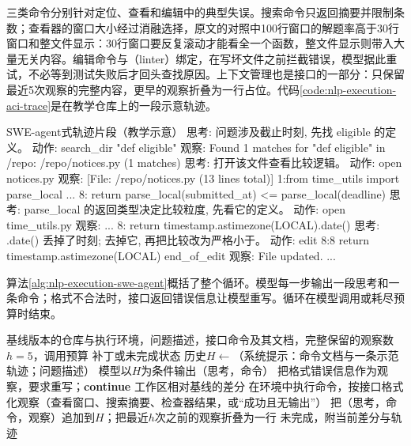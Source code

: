 三类命令分别针对定位、查看和编辑中的典型失误。搜索命令只返回摘要并限制条数；查看器的窗口大小经过消融选择，原文的对照中100行窗口的解题率高于30行窗口和整文件显示：30行窗口要反复滚动才能看全一个函数，整文件显示则带入大量无关内容。编辑命令与（linter）绑定，在写坏文件之前拦截错误，模型据此重试，不必等到测试失败后才回头查找原因。上下文管理也是接口的一部分：只保留最近5次观察的完整内容，更早的观察折叠为一行占位。代码\ref{code:nlp-execution-aci-trace}是在教学仓库上的一段示意轨迹。

\begin{codeblock}[label={code:nlp-execution-aci-trace}]{SWE-agent式轨迹片段（教学示意）}
思考: 问题涉及截止时刻, 先找 eligible 的定义。
动作: search_dir "def eligible"
观察: Found 1 matches for "def eligible" in /repo:
      /repo/notices.py (1 matches)
思考: 打开该文件查看比较逻辑。
动作: open notices.py
观察: [File: /repo/notices.py (13 lines total)]
      1:from time_utils import parse_local
      ...
      8:    return parse_local(submitted_at) <= parse_local(deadline)
思考: parse_local 的返回类型决定比较粒度, 先看它的定义。
动作: open time_utils.py
观察: ...
      8:    return timestamp.astimezone(LOCAL).date()
思考: .date() 丢掉了时刻; 去掉它, 再把比较改为严格小于。
动作: edit 8:8
          return timestamp.astimezone(LOCAL)
      end_of_edit
观察: File updated. ...
\end{codeblock}

算法\ref{alg:nlp-execution-swe-agent}概括了整个循环。模型每一步输出一段思考和一条命令；格式不合法时，接口返回错误信息让模型重写。循环在模型调用或耗尽预算时结束。

\begin{algorithm}
  \label{alg:nlp-execution-swe-agent}
  \begin{algorithmic}[1]
    \Require 基线版本的仓库与执行环境，问题描述，接口命令及其文档，完整保留的观察数$h=5$，调用预算
    \Ensure 补丁或未完成状态
    \State 历史$H\gets$（系统提示：命令文档与一条示范轨迹；问题描述）
      \State 模型以$H$为条件输出（思考，命令）
        \State 把格式错误信息作为观察，要求重写；\textbf{continue}
      \EndIf
        \State \Return 工作区相对基线的差分
      \EndIf
      \State 在环境中执行命令，按接口格式化观察（查看窗口、搜索摘要、检查器结果，或“成功且无输出”）
      \State 把（思考，命令，观察）追加到$H$；把最近$h$次之前的观察折叠为一行
    \EndWhile
    \State \Return 未完成，附当前差分与轨迹
  \end{algorithmic}
\end{algorithm}

